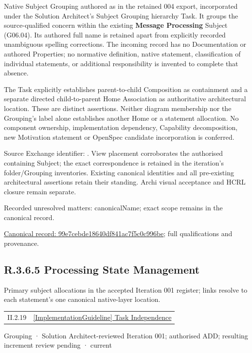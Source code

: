 Native Subject Grouping authored as \texttt{} in the retained 004 export,
incorporated under the Solution Architect's Subject Grouping hierarchy Task.
It groups the source-qualified \texttt{} concern within
the existing \textbf{Message Processing} Subject (G06.04). Its authored full name
is retained apart from explicitly recorded unambiguous spelling corrections.
The incoming record has no Documentation or authored Properties; no normative
definition, native statement, classification of individual statements, or
additional responsibility is invented to complete that absence.



The Task explicitly establishes parent-to-child Composition as containment and
a separate directed child-to-parent Home Association as authoritative architectural
location. These are distinct assertions. Neither diagram membership nor the
Grouping's label alone establishes another Home or a statement allocation.
No component ownership, implementation dependency, Capability decomposition,
new Motivation statement or OpenSpec candidate incorporation is conferred.



Source Exchange identifier: \texttt{}. View placement corroborates
the authorised containing Subject; the exact correspondence is retained in the
iteration's folder/Grouping inventories. Existing canonical identities and all
pre-existing architectural assertions retain their standing. Archi visual
acceptance and HCRL closure remain separate.


{\small Recorded unresolved matters: canonicalName; exact scope remains in the canonical record.}\par
{\footnotesize \href{../../../../continuum/grouping/99e7cebde18640df841ac7f5c0c996be.md}{Canonical record: 99e7cebde18640df841ac7f5c0c996be}; full qualifications and provenance.}\par
\subsection*{R.3.6.5 Processing State Management}
\label{navigation:R.3.6.5}

Primary subject allocations in the accepted Iteration 001 register; links resolve to each statement’s one canonical native-layer location.\par
\begin{longtable}{p{.22\linewidth}p{.73\linewidth}}
II.2.19 & \hyperref[element:80fe052799944843917044749288f297]{[ImplementationGuideline] Task Independence} \\
\end{longtable}
\label{element:5e8ddc78f9554243aeb051f77595cc88}
{\small Grouping · Solution Architect-reviewed Iteration 001; authorised ADD; resulting increment review pending · current}\par

